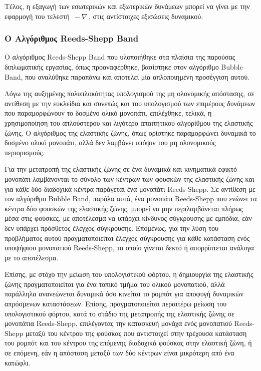 \bigskip
Τέλος, η εξαγωγή των εσωτερικών και εξωτερικών δυνάμεων μπορεί να γίνει με την εφαρμογή του τελεστή $\,-\nabla\,$, στις αντίστοιχες εξισώσεις δυναμικού.

\subsubsection{Ο Αλγόριθμος Reeds-Shepp Band} \label{sssec:rsband}
Ο αλγόριθμος Reeds-Shepp Band που υλοποιήθηκε στα πλαίσια της παρούσας διπλωματικής εργασίας, όπως προαναφέρθηκε, βασίστηκε στον αλγόριθμο Bubble Band, που αναλύθηκε παραπάνω και αποτελεί μία απλοποιημένη προσέγγιση αυτού. 

\bigskip
Λόγω της αυξημένης πολυπλοκότητας υπολογισμού της μη ολονομικής απόστασης, σε αντίθεση με την ευκλείδια και συνεπώς και του υπολογισμού των επιμέρους δυνάμεων που παραμορφώνουν το δοσμένο ολικό μονοπάτι, επιλέχθηκε, τελικά, η χρησιμοποίηση του απλούστερου και λιγότερο απαιτητικού αλγορίθμου της ελαστικής ζώνης. Ο αλγόριθμος της ελαστικής ζώνης, όπως ορίστηκε παραμορφώνει δυναμικά το δοσμένο ολικό μονοπάτι, αλλά δεν λαμβάνει υπόψιν του μη ολονομικούς περιορισμούς. 

\bigskip
Για την μετατροπή της ελαστικής ζώνης σε ένα δυναμικά και κινηματικά εφικτό μονοπάτι λαμβάνονται το σύνολο των κέντρων των φουσκών της ελαστικής ζώνης και για κάθε δύο διαδοχικά κέντρα παράγεται ένα μονοπάτι Reeds-Shepp. Σε αντίθεση με τον αλγόριθμο Bubble Band, παρόλα αυτά, ένα μονοπάτι Reeds-Shepp που ενώνει τα κέντρα δύο φουσκών της ελαστικής ζώνης, μπορεί να μην περιλαμβάνεται πλήρως μέσα στις φούσκες, με αποτέλεσμα να υπάρχει κίνδυνος σύγκρουσης με εμπόδια, εάν δεν υπάρχει πρόσθετος έλεγχος σύγκρουσης. Επομένως, για την λύση του προβλήματος αυτού πραγματοποιείται έλεγχος σύγκρουσης για κάθε κατάσταση ενός υποψήφιου μονοπατιού Reeds-Shepp, το οποίο γίνεται δεκτό ή απορρίπτεται ανάλογα με το αποτέλεσμα.

\bigskip
Επίσης, με στόχο την μείωση του υπολογιστικού φόρτου, η δημιουργία της ελαστικής ζώνης πραγματοποιείται για ένα τοπικό τμήμα του ολικού μονοπατιού, αλλά παράλληλα ανανεώνεται δυναμικά όσο κινείται το ρομπότ για αποφυγή δυναμικών απρόσμενων καταστάσεων. Επίσης, πραγματοποιείται περαιτέρω μείωση του υπολογιστικού φόρτου, κατά το στάδιο της μετατροπής της ελαστικής ζώνης σε μονοπάτια Reeds-Shepp, επιλέγοντας την κατασκευή μονάχα ενός μονοπατιού Reeds-Shepp μεταξύ του κέντρου της φούσκας που αντιστοιχεί στην τρέχουσα κατάσταση του ρομπότ και του κέντρου της επόμενης διαδοχικά φούσκας στην ελαστική ζώνη, ή σε επόμενη, εάν η απόσταση μεταξύ των δύο κέντρων είναι μικρότερη από ένα κατώφλι.

